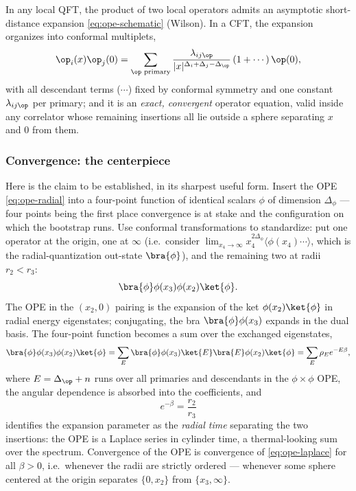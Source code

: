 \begin{ddefinition}
\label{def:ope}
In any local QFT, the product of two local operators admits an asymptotic
short-distance expansion \eqref{eq:ope-schematic} (Wilson). In a CFT, the
expansion organizes into conformal multiplets,
\begin{equation}
\op_i(x)\op_j(0) = \sum_{\op\text{ primary}}
\frac{\lambda_{ij\op}}{|x|^{\Delta_i+\Delta_j-\Delta_\op}}
\left(1 + \cdots\right)\op(0),
\end{equation}
with all descendant terms ($\cdots$) fixed by conformal symmetry and one
constant $\lambda_{ij\op}$ per primary; and it is an \emph{exact, convergent}
operator equation, valid inside any correlator whose remaining insertions all
lie outside a sphere separating $x$ and $0$ from them.
\end{ddefinition}

\subsubsection{Convergence: the centerpiece}
\label{sec:ope-convergence}

Here is the claim to be established, in its sharpest useful form. Insert the
OPE \eqref{eq:ope-radial} into a four-point function of identical scalars
$\phi$ of dimension $\Delta_\phi$ --- four points being the first place
convergence is at stake and the configuration on which the bootstrap runs.
Use conformal transformations to standardize: put one operator at the origin,
one at $\infty$ (i.e.\ consider $\lim_{x_4\to\infty} x_4^{2\Delta_\phi}
\langle \phi(x_4)\cdots\rangle$, which is the radial-quantization out-state
$\bra{\phi}$), and the remaining two at radii $r_2 < r_3$:
\begin{equation}
\bra{\phi}\phi(x_3)\phi(x_2)\ket{\phi}.
\label{eq:4pt-radial}
\end{equation}
The OPE in the $(x_2, 0)$ pairing is the expansion of the ket $\phi(x_2)
\ket{\phi}$ in radial energy eigenstates; conjugating, the bra
$\bra{\phi}\phi(x_3)$ expands in the dual basis. The four-point function
becomes a sum over the exchanged eigenstates,
\begin{equation}
\bra{\phi}\phi(x_3)\phi(x_2)\ket{\phi}
= \sum_{E} \bra{\phi}\phi(x_3)\ket{E}\bra{E}\phi(x_2)\ket{\phi}
= \sum_{E} \rho_E e^{-E \beta},
\label{eq:ope-laplace}
\end{equation}
where $E = \Delta_\op + n$ runs over all primaries and descendants in the
$\phi\times\phi$ OPE, the angular dependence is absorbed into the
coefficients, and
\begin{equation}
e^{-\beta} = \frac{r_2}{r_3}
\end{equation}
identifies the expansion parameter as the \emph{radial time} separating the
two insertions: the OPE is a Laplace series in cylinder time, a thermal-looking
sum over the spectrum. Convergence of the OPE is convergence of
\eqref{eq:ope-laplace} for all $\beta > 0$, i.e.\ whenever the radii are
strictly ordered --- whenever some sphere centered at the origin separates
$\{0, x_2\}$ from $\{x_3, \infty\}$.

